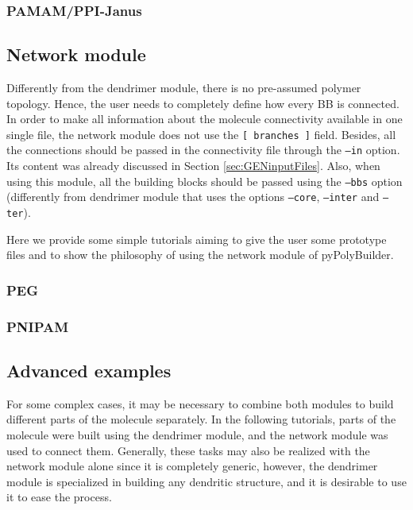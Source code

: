 \documentclass[12pt]{article}
\begin{document}
\subsubsection{PAMAM/PPI-Janus}
\label{PAMAM/PPI-Janus}

\clearpage

\subsection{Network module}
Differently from the dendrimer module, there is no pre-assumed polymer topology.
Hence, the user needs to completely define how every BB is connected.
In order to make all information about the molecule connectivity available in one single file, the network module does not use the \texttt{[ branches ]} field.
Besides, all the connections should be passed in the connectivity file through the \texttt{--in} option.
Its content was already discussed in Section \ref{sec:GENinputFiles}.
Also, when using this module, all the building blocks should be passed using the \texttt{--bbs} option (differently from dendrimer module that uses the options \texttt{--core}, \texttt{--inter} and \texttt{--ter}).

Here we provide some simple tutorials aiming to give the user some prototype files and to show the philosophy of using the network module of pyPolyBuilder.

\subsubsection{PEG}

\clearpage

\subsubsection{PNIPAM}

\clearpage

% 

% 


\subsection{Advanced examples}
For some complex cases, it may be necessary to combine both modules to build different parts of the molecule separately. 
In the following tutorials, parts of the molecule were built using the dendrimer module, and the network module was used to connect them.
Generally, these tasks may also be realized with the network module alone since it is completely generic, however, the dendrimer module is specialized in building any dendritic structure, and it is desirable to use it to ease the process.
\end{document}
